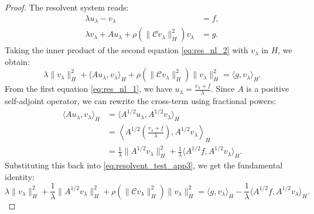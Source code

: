 \documentclass[11pt,reqno]{amsart}
\theoremstyle{remark}
\begin{document}
\begin{proof}
The resolvent system reads:
\begin{align}
\lambda u_\lambda - v_\lambda &= f, \label{eq:res_nl_1} \\
\lambda v_\lambda + A u_\lambda + \rho(\|\mathcal C v_\lambda\|_H^2) v_\lambda &= g. \label{eq:res_nl_2}
\end{align}
Taking the inner product of the second equation \eqref{eq:res_nl_2} with $v_\lambda$ in $H$, we obtain:
\begin{equation}\label{eq:resolvent_test_app3}
\lambda \|v_\lambda\|_H^2 + \langle A u_\lambda, v_\lambda \rangle_H + \rho(\|\mathcal C v_\lambda\|_H^2) \|v_\lambda\|_H^2 = \langle g, v_\lambda \rangle_H.
\end{equation}
From the first equation \eqref{eq:res_nl_1}, we have $u_\lambda = \frac{v_\lambda + f}{\lambda}$. Since $A$ is a positive self-adjoint operator, we can rewrite the cross-term using fractional powers:
\begin{align*}
\langle A u_\lambda, v_\lambda \rangle_H &= \langle A^{1/2} u_\lambda, A^{1/2} v_\lambda \rangle_H \\
&= \left\langle A^{1/2} \left(\frac{v_\lambda + f}{\lambda}\right), A^{1/2} v_\lambda \right\rangle_H \\
&= \frac{1}{\lambda} \|A^{1/2} v_\lambda\|_H^2 + \frac{1}{\lambda} \langle A^{1/2} f, A^{1/2} v_\lambda \rangle_H.
\end{align*}
Substituting this back into \eqref{eq:resolvent_test_app3}, we get the fundamental identity:
\begin{equation}
\lambda \|v_\lambda\|_H^2 + \frac{1}{\lambda} \|A^{1/2} v_\lambda\|_H^2 + \rho(\|\mathcal C v_\lambda\|_H^2) \|v_\lambda\|_H^2 = \langle g, v_\lambda \rangle_H - \frac{1}{\lambda} \langle A^{1/2} f, A^{1/2} v_\lambda \rangle_H.
\end{equation}


\end{proof}
\end{document}
